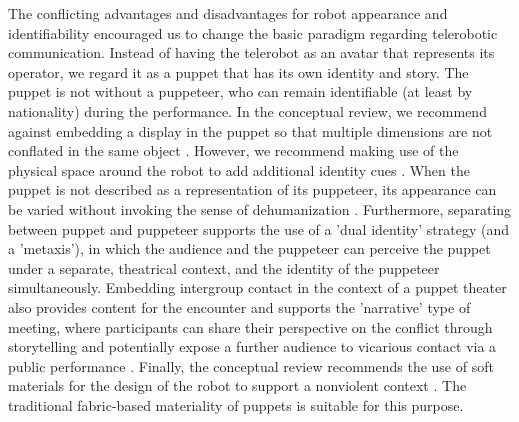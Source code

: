 \documentclass[dissertation,math,vertlayout,pdfa,colorlinks]{aaltoseries}
\begin{document}
The conflicting advantages and disadvantages for robot appearance and identifiability encouraged us to change the basic paradigm regarding telerobotic communication. Instead of having the telerobot as an avatar that represents its operator, we regard it as a puppet that has its own identity and story. The puppet is not without a puppeteer, who can remain identifiable (at least by nationality) during the performance. In the conceptual review, we recommend against embedding a display in the puppet so that multiple dimensions are not conflated in the same object \cite[p. 81]{peledTelerobotContactHypothesis2022}. However, we recommend making use of the physical space around the robot to add additional identity cues \cite[p. 79]{peledTelerobotContactHypothesis2022}. When the puppet is not described as a representation of its puppeteer, its appearance can be varied without invoking the sense of dehumanization \cite[p. 88]{peledTelerobotContactHypothesis2022}. Furthermore, separating between puppet and puppeteer supports the use of a 'dual identity' strategy (and a 'metaxis'), in which the audience and the puppeteer can perceive the puppet under a separate, theatrical context, and the identity of the puppeteer simultaneously. Embedding intergroup contact in the context of a puppet theater also provides content for the encounter and supports the 'narrative' type of meeting, where participants can share their perspective on the conflict through storytelling and potentially expose a further audience to vicarious contact via a public performance \cite[p. 88]{peledTelerobotContactHypothesis2022}. Finally, the conceptual review recommends the use of soft materials for the design of the robot to support a nonviolent context \cite[p. 83]{peledTelerobotContactHypothesis2022}. The traditional fabric-based materiality of puppets is suitable for this purpose.
\end{document}
